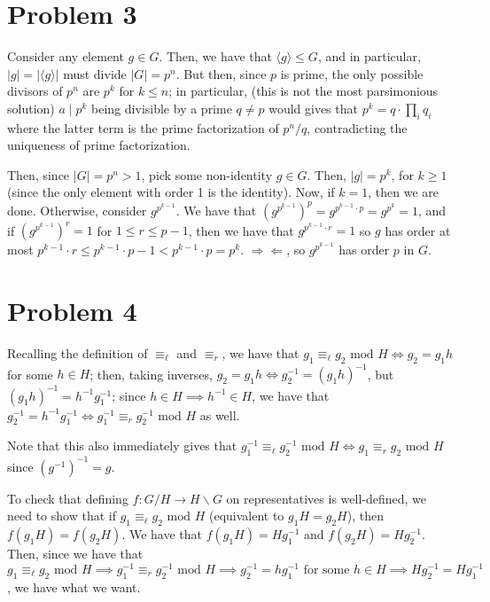 \documentclass[12pt,letterpaper]{article}
\theoremstyle{definition}
\newcommand{\contra}{\Rightarrow\!\Leftarrow}
\begin{document}
\section*{Problem 3}

Consider any element $g \in G$. Then, we have that $\langle g \rangle \leq G$, and in particular, $|g| = |\langle g \rangle|$ must divide $|G| = p^{n}$. But then, since $p$ is prime, the only possible divisors of $p^{n}$ are $p^{k}$ for $k \leq n$; in particular, (this is not the most parsimonious solution) $a \mid p^{k}$ being divisible by a prime $q \neq p$ would gives that $p^{k} = q \cdot \prod_{i}q_{i}$ where the latter term is the prime factorization of $p^{n}/q$, contradicting the uniqueness of prime factorization.

Then, since $|G| = p^{n} > 1$, pick some non-identity $g \in G$. Then, $|g| = p^{k}$, for $k \geq 1$ (since the only element with order 1 is the identity). Now, if $k = 1$, then we are done. Otherwise, consider $g^{p^{k-1}}$. We have that $(g^{p^{k-1}})^{p} = g^{p^{k-1} \cdot p} = g^{p^{k}} = 1$, and if $(g^{p^{k-1}})^{r} = 1$ for $1 \leq r \leq p - 1$, then we have that $g^{p^{k-1} \cdot r} = 1$ so $g$ has order at most $p^{k-1} \cdot r \leq p^{k-1} \cdot p - 1 < p^{k-1} \cdot p = p^{k}$. $\contra$, so $g^{p^{k-1}}$ has order $p$ in $G$.

\section*{Problem 4}

Recalling the definition of $\equiv_{\ell}$ and $\equiv_{r}$, we have that $g_{1} \equiv_{\ell} g_{2} \text{ mod } H \iff g_{2} = g_{1}h$ for some $h \in H$; then, taking inverses, $g_{2} = g_{1}h \iff g_{2}^{-1} = (g_{1}h)^{-1}$, but $(g_{1}h)^{-1} = h^{-1}g_{1}^{-1}$; since $h \in H \implies h^{-1} \in H$, we have that $g_{2}^{-1} = h^{-1}g_{1}^{-1} \iff g_{1}^{-1} \equiv_{r} g_{2}^{-1} \text{ mod } H$ as well.

Note that this also immediately gives that $g_{1}^{-1} \equiv_{\ell} g_{2}^{-1} \text{ mod } H \iff g_{1} \equiv_{r} g_{2} \text{ mod } H$ since $(g^{-1})^{-1} = g$.

To check that defining $f: G/H \rightarrow H\backslash G$ on representatives is well-defined, we need to show that if $g_{1} \equiv_{\ell} g_{2} \text{ mod } H$ (equivalent to $g_{1}H = g_{2}H$), then $f(g_{1}H) = f(g_{2}H)$. We have that $f(g_{1}H) = Hg_{1}^{-1}$ and $f(g_{2}H) = Hg_{2}^{-1}$. Then, since we have that $g_{1} \equiv_{\ell} g_{2} \text{ mod } H \implies g_{1}^{-1} \equiv_{r} g_{2}^{-1}  \text{ mod } H \implies g_{2}^{-1} = hg_{1}^{-1} \text{ for some } h \in H \implies Hg_{2}^{-1} = Hg_{1}^{-1}$, we have what we want.
\end{document}
